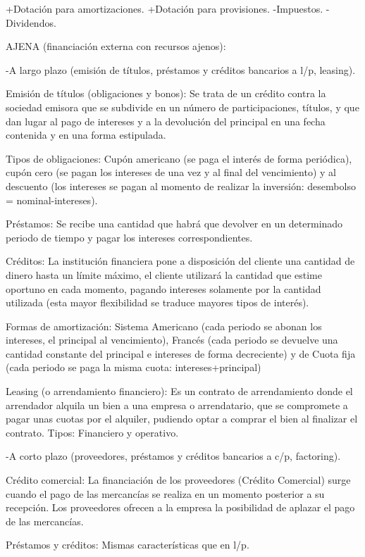 \documentclass[12pt, twoside, openright]{report} %
\begin{document}
+Dotación para amortizaciones. +Dotación para provisiones. -Impuestos. -Dividendos.

AJENA (financiación externa con recursos ajenos):

-A largo plazo (emisión de títulos, préstamos y créditos bancarios a l/p, leasing).

Emisión de títulos (obligaciones y bonos): Se trata de un crédito contra la sociedad emisora que se subdivide
en un número de participaciones, títulos, y que dan lugar al pago de intereses y a la devolución del principal
en una fecha contenida y en una forma estipulada.

Tipos de obligaciones: Cupón americano (se paga el interés de forma periódica), cupón cero (se pagan los
intereses de una vez y al final del vencimiento) y al descuento (los intereses se pagan al momento de realizar
la inversión: desembolso = nominal-intereses).

Préstamos: Se recibe una cantidad que habrá que devolver en un determinado periodo de tiempo y pagar
los intereses correspondientes.

Créditos: La institución financiera pone a disposición del cliente una cantidad de dinero hasta un límite
máximo, el cliente utilizará la cantidad que estime oportuno en cada momento, pagando intereses solamente
por la cantidad utilizada (esta mayor flexibilidad se traduce mayores tipos de interés).

Formas de amortización: Sistema Americano (cada periodo se abonan los intereses, el principal al
vencimiento), Francés (cada periodo se devuelve una cantidad constante del principal e intereses de forma
decreciente) y de Cuota fija (cada periodo se paga la misma cuota: intereses+principal)

Leasing (o arrendamiento financiero): Es un contrato de arrendamiento donde el arrendador alquila un bien
a una empresa o arrendatario, que se compromete a pagar unas cuotas por el alquiler, pudiendo optar a
comprar el bien al finalizar el contrato. Tipos: Financiero y operativo.

-A corto plazo (proveedores, préstamos y créditos bancarios a c/p, factoring).

Crédito comercial: La financiación de los proveedores (Crédito Comercial) surge cuando el pago de las
mercancías se realiza en un momento posterior a su recepción. Los proveedores ofrecen a la empresa la
posibilidad de aplazar el pago de las mercancías.

Préstamos y créditos: Mismas características que en l/p.
\end{document}
